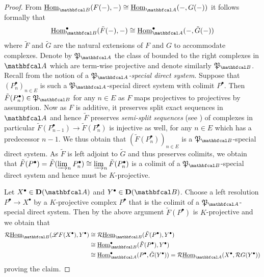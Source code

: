 \begin{proof}
	From $\eHom_\category{B}(F(-), -)\cong \eHom_\category{A}(-, G(-))$ it follows formally that
	$$\eHom_\category{B}^\bullet(\tilde F(-), -)\cong \eHom^\bullet_\category{A}(-, \tilde G(-))$$
	where $\tilde F$ and $\tilde G$ are the natural extensions of $F$ and $G$ to accommodate complexes. Denote by $\mathfrak{P}_\category{A}$ the class of bounded to the right complexes in $\category{A}$ which are term-wise projective and denote similarly $\mathfrak{P}_\category{B}$. Recall from \cite[Def. 2.6]{spaltenstein} the notion of a \emph{$\mathfrak{P}_\category{A}$-special direct system}. Suppose that $(P_n^\bullet)_{n\in E}$ is such a $\mathfrak{P}_\category{A}$-special direct system with colimit $P^\bullet$. Then $\tilde F(P^\bullet_n) \in \mathfrak{P}_\category{B}$ for any $n\in E$ as $F$ maps projectives to projectives by assumption. Now as $F$ is additive, it preserves split exact sequences in $\category{A}$ and hence $\tilde F$ preserves \emph{semi-split sequences} (see \cite[Def. 0.5]{spaltenstein}) of complexes in particular $\tilde F(P^\bullet_{n-1})\to\tilde F(P^\bullet_n)$ is injective as well, for any $n\in E$ which has a predecessor $n-1$. We thus obtain that $(\tilde F(P^\bullet_n))_{n\in E}$ is a $\mathfrak{P}_\category{B}$-special direct system. As $\tilde F$ is left adjoint to $\tilde G$ and thus preserves colimits, we obtain that $\tilde F(P^\bullet) = \tilde F(\varinjlim_n P^\bullet_n) \cong \varinjlim_n \tilde F(P^\bullet_n)$ is a colimit of a $\mathfrak{P}_\category{B}$-special direct system and hence must be $K$-projective.
	
	Let $X^\bullet \in \derived{\category{A}}$ and $Y^\bullet \in \derived{\category{B}}$. Choose a left resolution $P^\bullet \to X^\bullet$ by a $K$-projective complex $P^\bullet$ that is the colimit of a $\mathfrak{P}_\category{A}$-special direct system. Then by the above argument $\tilde F(P^\bullet)$ is $K$-projective and we obtain that
	\begin{align*}
		\eRHom_\category{B}(\LeftD F(X^\bullet), Y^\bullet)
		&\cong\eRHom_\category{B}(\tilde F(P^\bullet), Y^\bullet)\\
		&\cong\eHom_\category{B}^\bullet(\tilde F(P^\bullet), Y^\bullet)\\
		&\cong \eHom_\category{A}^\bullet(P^\bullet, \tilde G(Y^\bullet)) = \eRHom_\category{A}(X^\bullet, \RightD G(Y^\bullet))
	\end{align*}
	proving the claim.
\end{proof}

